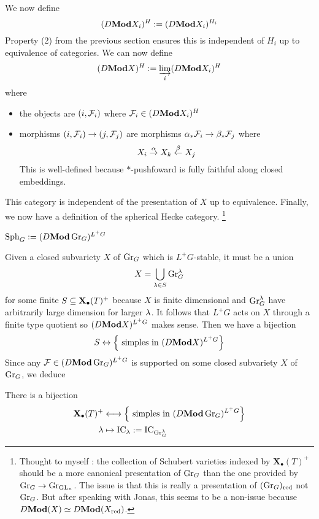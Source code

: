 \documentclass{article}
\begin{document}
We now define 
\[
  (D\mathbf{Mod} X_i)^H := (D\mathbf{Mod} X_i)^{H_i}
\]
Property (2) from the previous section ensures this is
independent of $H_i$ up to equivalence of categories.
We can now define
\[
  (D\mathbf{Mod} X)^H := \varinjlim_{i} (D\mathbf{Mod} X_i)^H
\]
where
\begin{itemize}
  \item the objects are $(i, \mathcal{F}_i)$ where $\mathcal{F}_i \in (D\mathbf{Mod} X_i)^H$
  \item morphisms $(i , \mathcal{F}_i) \to (j , \mathcal{F}_j)$ are
  morphisms $\alpha_* \mathcal{F}_i \to \beta_* \mathcal{F}_j$ where
  \[
    X_i \overset{\alpha}{\to} X_k \overset{\beta}{\leftarrow} X_j
  \]
  This is well-defined because $*$-pushfoward is fully faithful along
  closed embeddings.
\end{itemize}
This category is independent of the presentation of $X$
up to equivalence.
Finally, we now have a definition of the spherical Hecke category.
\footnote{
  Thought to myself : 
  the collection of Schubert varieties indexed by $\mathbf{X}_\bullet(T)^+$
  should be a more canonical presentation of $\operatorname{Gr}_G$
  than the one provided by $\operatorname{Gr}_G \to \operatorname{Gr}_{\operatorname{GL}_n}$.
  The issue is that this is really a presentation of $(\operatorname{Gr}_G)_{\mathrm{red}}$ not 
  $\operatorname{Gr}_G$.
  But after speaking with Jonas,
  this seems to be a non-issue because 
  $D\mathbf{Mod}(X) \simeq D\mathbf{Mod}(X_{\mathrm{red}})$.
}
\begin{dfn}

  $\operatorname{Sph}_G := (D\mathbf{Mod} \operatorname{Gr}_G)^{L^+ G}$
\end{dfn}

Given a closed subvariety $X$ of $\operatorname{Gr}_G$ which is $L^+G$-stable,
it must be a union
\[
  X = \bigcup_{\lambda \in S} \operatorname{Gr}_G^\lambda
\]
for some finite $S \subseteq \mathbf{X}_\bullet(T)^+$
because $X$ is finite dimensional and 
$\operatorname{Gr}_G^\lambda$ have arbitrarily large dimension for larger $\lambda$.
It follows that $L^+G$ acts on $X$ through a finite type quotient
so $(D\mathbf{Mod} X)^{L^+G}$ makes sense.
Then we have a bijection
\[
  S \leftrightarrow \left\{\text{ simples in $(D\mathbf{Mod} X)^{L^+G}$}\right\}
\]
Since any $\mathcal{F} \in (D\mathbf{Mod} \operatorname{Gr}_G)^{L^+G}$ is supported on some
closed subvariety $X$ of $\operatorname{Gr}_G$,
we deduce
\begin{prop}

  There is a bijection 
  \begin{align*}
    \mathbf{X}_\bullet(T)^+ &\longleftrightarrow 
      \left\{\text{ simples in $(D\mathbf{Mod} \operatorname{Gr}_G)^{L^+ G}$}\right\} \\
    \lambda &\mapsto \mathrm{IC}_\lambda := \mathrm{IC}_{\operatorname{Gr}_G^\lambda}
  \end{align*}
\end{prop}
\end{document}
